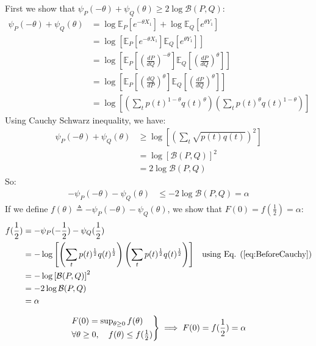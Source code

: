 \documentclass{article}
\numberwithin{equation}{section}
\newcommand{\EX}[2][]{\mathbb{E}_{#1}\left[#2\right]}%
\begin{document}
\subsection{}
First we show that \( \psi_P(-\theta) + \psi_Q(\theta) \ge 2\log \mathcal{B}(P, Q)\):
\begin{align}
\psi_P(-\theta) + \psi_Q(\theta) &= \log \EX[P]{e^{-\theta X_1}} + \log \EX[Q]{e^{\theta Y_1}}\\
&=\log \left[\EX[P]{e^{-\theta X_1}} \EX[Q]{e^{\theta Y_1}}\right]\\
&=\log \left[\EX[P]{(\frac{dP}{dQ})^{-\theta}} \EX[Q]{(\frac{dP}{dQ})^{\theta}}\right]\\
&=\log \left[\EX[P]{(\frac{dQ}{dP})^{\theta}} \EX[Q]{(\frac{dP}{dQ})^{\theta}}\right]\\
&= \log \left[ \left(\sum_t p(t)^{1-\theta} q(t)^{\theta}\right) \left(\sum_t p(t)^{\theta} q(t)^{1-\theta}\right) \right] \label{eq:BeforeCauchy}
\end{align}
Using Cauchy Schwarz inequality, we have:
\begin{align}
\psi_P(-\theta) + \psi_Q(\theta) &\ge \log \left[ \left(\sum_t \sqrt{p(t) q(t)}\right)^2 \right]\\
&= \log \left[ \mathcal{B}(P, Q) \right]^2\\
&= 2\log \mathcal{B}(P, Q)
\end{align}
So:
\begin{align}
-\psi_P(-\theta) - \psi_Q(\theta) &\le -2\log \mathcal{B}(P, Q) = \alpha
\end{align}
If we define \(f(\theta) \triangleq -\psi_P(-\theta) - \psi_Q(\theta)\), we show that \(F(0) = f(\frac{1}{2}) = \alpha\):
\begin{align}
f(\frac{1}{2}) &= -\psi_P(-\frac{1}{2}) - \psi_Q(\frac{1}{2})\\
&= -\log \left[ \left(\sum_t p(t)^{\frac{1}{2}} q(t)^{\frac{1}{2}}\right) \left(\sum_t p(t)^{\frac{1}{2}} q(t)^{\frac{1}{2}}\right) \right] & \text{using Eq. (\eqref{eq:BeforeCauchy})}\\
&= -\log \left[ \mathcal{B}(P, Q) \right]^2\\
&= -2\log \mathcal{B}(P, Q)\\
&= \alpha
\end{align}

\begin{gather}
\begin{rcases*}
F(0)
= \sup_{\theta\ge 0} f(\theta) \\
\forall \theta \ge 0, \quad f(\theta) \le f(\frac{1}{2})
\end{rcases*} \implies F(0) = f(\frac{1}{2}) = \alpha
\end{gather}
\end{document}
